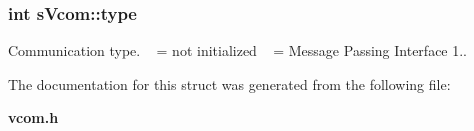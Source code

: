 \subsubsection[{type}]{\setlength{\rightskip}{0pt plus 5cm}int s\+Vcom\+::type}\label{a00001_a060d49d499bd19965c61974be24423ba}


Communication type. ~ = not initialized ~ = Message Passing Interface 1.. 



The documentation for this struct was generated from the following file\+:\begin{DoxyCompactItemize}
\item 
{\bf vcom.\+h}\end{DoxyCompactItemize}
